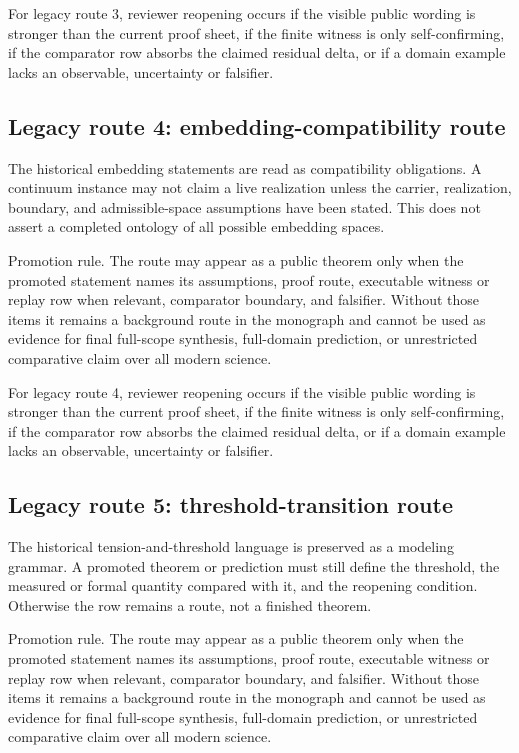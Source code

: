 For legacy route 3, reviewer reopening occurs if the visible public wording is stronger than the current proof sheet, if the finite witness is only self-confirming, if the comparator row absorbs the claimed residual delta, or if a domain example lacks an observable, uncertainty or falsifier.


\subsection{Legacy route 4: embedding-compatibility route}

The historical embedding statements are read as compatibility obligations. A continuum instance may not claim a live realization unless the carrier, realization, boundary, and admissible-space assumptions have been stated. This does not assert a completed ontology of all possible embedding spaces.


Promotion rule. The route may appear as a public theorem only when the promoted statement names its assumptions, proof route, executable witness or replay row when relevant, comparator boundary, and falsifier. Without those items it remains a background route in the monograph and cannot be used as evidence for final full-scope synthesis, full-domain prediction, or unrestricted comparative claim over all modern science.


For legacy route 4, reviewer reopening occurs if the visible public wording is stronger than the current proof sheet, if the finite witness is only self-confirming, if the comparator row absorbs the claimed residual delta, or if a domain example lacks an observable, uncertainty or falsifier.


\subsection{Legacy route 5: threshold-transition route}

The historical tension-and-threshold language is preserved as a modeling grammar. A promoted theorem or prediction must still define the threshold, the measured or formal quantity compared with it, and the reopening condition. Otherwise the row remains a route, not a finished theorem.


Promotion rule. The route may appear as a public theorem only when the promoted statement names its assumptions, proof route, executable witness or replay row when relevant, comparator boundary, and falsifier. Without those items it remains a background route in the monograph and cannot be used as evidence for final full-scope synthesis, full-domain prediction, or unrestricted comparative claim over all modern science.


